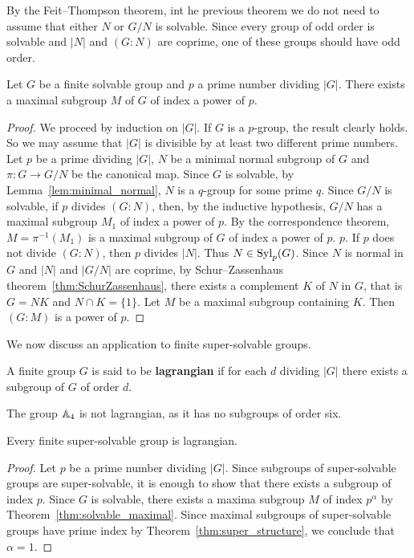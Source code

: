 By the Feit--Thompson theorem, int he previous theorem 
we do not need to assume that either $N$ or $G/N$ is solvable. Since every group of odd order is solvable 
and $|N|$ and $(G:N)$ are coprime, one of these groups should have odd order. 

\begin{theorem}
	\label{thm:solvable_maximal}
	Let $G$ be a finite solvable group and $p$ a prime number dividing $|G|$. There exists a maximal 
    subgroup $M$ of $G$ of index a power of $p$. 
\end{theorem}

\begin{proof}
	We proceed by induction on $|G|$. If $G$ is a $p$-group, the result clearly holds. So we may assume that $|G|$ is divisible by at least two different prime numbers. 
    Let $p$ be a prime dividing $|G|$, $N$ be a minimal normal subgroup of $G$ and 
    $\pi\colon G\to G/N$ be the canonical map. Since $G$ is solvable, by Lemma~\ref{lem:minimal_normal}, 
    $N$ is a $q$-group for some prime $q$. Since $G/N$ is solvable, if $p$ divides 
	$(G:N)$, then, by the inductive hypothesis, $G/N$ has a maximal subgroup 
 	$M_1$ of index a power of $p$. By the correspondence theorem, 
  $M=\pi^{-1}(M_1)$ is a maximal subgroup of $G$ of index a power of $p$. 
  $p$. If $p$ does not divide $(G:N)$, then $p$ divides $|N|$. Thus 
	$N\in\mathrm{Syl}_p(G)$. Since $N$ is normal in $G$ and $|N|$ and $|G/N|$ are coprime, by 
	Schur--Zassenhaus theorem~\ref{thm:SchurZassenhaus}, 
	there exists a complement $K$ of $N$ in $G$, that is $G=NK$ and $N\cap K=\{1\}$. Let 
	$M$ be a maximal subgroup containing $K$. Then $(G:M)$ is a power of $p$. 
\end{proof}

We now discuss an application to finite super-solvable groups. 

\begin{definition}
	A finite group $G$ is said to be \textbf{lagrangian} if for each $d$ dividing $|G|$ 
	there exists a subgroup of $G$ of order $d$.
\end{definition}

The group $\mathbb{A}_4$ is not lagrangian, as it has no subgroups of order six. 

\begin{theorem}
	Every finite super-solvable group is lagrangian. 
\end{theorem}

\begin{proof}
	Let $p$ be a prime number dividing $|G|$. Since subgroups of super-solvable groups are super-solvable, it is enough to 
    show that there exists a subgroup of index $p$. 
	Since $G$ is solvable, there exists a maxima subgroup $M$ of index 
	$p^{\alpha}$ by Theorem~\ref{thm:solvable_maximal}. Since maximal subgroups of super-solvable groups have prime index 
    by Theorem~\ref{thm:super_structure}, we conclude that $\alpha=1$.
\end{proof}